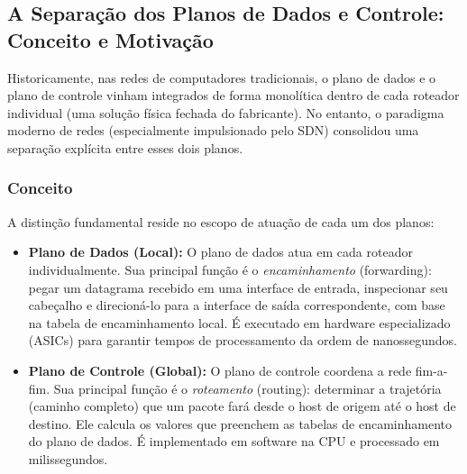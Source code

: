 \documentclass[11pt,a4paper]{article}
\begin{document}
\subsection{A Separação dos Planos de Dados e Controle: Conceito e Motivação}

Historicamente, nas redes de computadores tradicionais, o plano de dados e o plano de controle vinham integrados de forma monolítica dentro de cada roteador individual (uma solução física fechada do fabricante). No entanto, o paradigma moderno de redes (especialmente impulsionado pelo SDN) consolidou uma separação explícita entre esses dois planos.

\subsubsection{Conceito}
A distinção fundamental reside no escopo de atuação de cada um dos planos:
\begin{itemize}
    \item \textbf{Plano de Dados (Local):} O plano de dados atua em cada roteador individualmente. Sua principal função é o \emph{encaminhamento} (forwarding): pegar um datagrama recebido em uma interface de entrada, inspecionar seu cabeçalho e direcioná-lo para a interface de saída correspondente, com base na tabela de encaminhamento local. É executado em hardware especializado (ASICs) para garantir tempos de processamento da ordem de nanossegundos.
    \item \textbf{Plano de Controle (Global):} O plano de controle coordena a rede fim-a-fim. Sua principal função é o \emph{roteamento} (routing): determinar a trajetória (caminho completo) que um pacote fará desde o host de origem até o host de destino. Ele calcula os valores que preenchem as tabelas de encaminhamento do plano de dados. É implementado em software na CPU e processado em milissegundos.
\end{itemize}
\end{document}

